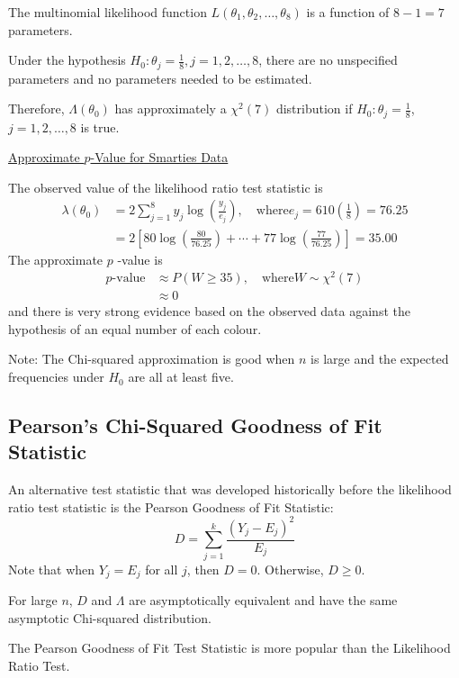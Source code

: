 The multinomial likelihood function $L\left(\theta_{1}, \theta_{2}, \ldots, \theta_{8}\right)$ is
a function of $8-1=7$ parameters.

Under the hypothesis $H_{0}: \theta_{j}=\frac{1}{8}, j=1,2, \ldots, 8$, there are no
unspecified parameters and no parameters needed to be estimated.

Therefore, $\Lambda\left(\theta_{0}\right)$ has approximately a $\chi^{2}(7)$ distribution if
$H_{0}: \theta_{j}=\frac{1}{8} $, $ j=1,2, \ldots, 8$ is true.

\underline{Approximate $ p $-Value for Smarties Data}

The observed value of the likelihood ratio test statistic is
\[
    \begin{aligned}
        \lambda\left(\theta_{0}\right) & =2 \sum_{j=1}^{8} y_{j} \log \left(\frac{y_{j}}{e_{j}}\right), \quad \text{where} e_{j}=610\left(\frac{1}{8}\right)=76.25 \\
                                       & =2\left[80 \log \left(\frac{80}{76.25}\right)+\cdots+77 \log \left(\frac{77}{76.25}\right)\right]=35.00
    \end{aligned}
\]
The approximate $p$ -value is
\[
    \begin{aligned}
        p\text{-value}
         & \approx P(W \geq 35), \quad \text{where} W \sim \chi^{2}(7) \\
         & \approx 0
    \end{aligned}
\]
and there is very strong evidence based on the observed data against the hypothesis of
an equal number of each colour.

Note: The Chi-squared approximation is good when $n$ is large and the expected
frequencies under $H_{0}$ are all at least five.

\subsection{Pearson's Chi-Squared Goodness of Fit Statistic}

An alternative test statistic that was developed historically before the likelihood ratio
test statistic is the Pearson Goodness of Fit Statistic:
\[
    D=\sum_{j=1}^{k} \frac{\left(Y_{j}-E_{j}\right)^{2}}{E_{j}}
\]
Note that when $Y_{j}=E_{j}$ for all $j$, then $D=0$.
Otherwise, $D \geq 0$.

For large $ n $, $ D $ and $ \Lambda $ are asymptotically equivalent and have the
same asymptotic Chi-squared distribution.

The Pearson Goodness of Fit Test Statistic is more popular than the Likelihood Ratio Test.

